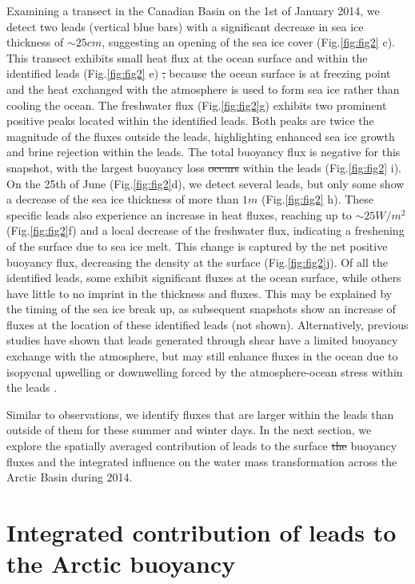 \documentclass[lineno,sn-basic]{sn-jnl}%
\providecommand{\DIFadd}[1]{{\protect\color{blue}\uwave{#1}}} %
\providecommand{\DIFdel}[1]{{\protect\color{red}\sout{#1}}}                      %
\providecommand{\DIFaddbegin}{} %
\providecommand{\DIFaddend}{} %
\providecommand{\DIFdelbegin}{} %
\providecommand{\DIFdelend}{} %
\newcommand{\DIFscaledelfig}{0.5}
\newlength{\DIFdelgraphicswidth} %
\newlength{\DIFdelgraphicsheight} %
\newcommand{\DIFaddincludegraphics}[2][]{{\color{blue}\fbox{\DIFOincludegraphics[#1]{#2}}}} %
\newcommand{\DIFdelincludegraphics}[2][]{%
\sbox{\DIFdelgraphicsbox}{\DIFOincludegraphics[#1]{#2}}%
\settoboxwidth{\DIFdelgraphicswidth}{\DIFdelgraphicsbox} %
\settoboxtotalheight{\DIFdelgraphicsheight}{\DIFdelgraphicsbox} %
\scalebox{\DIFscaledelfig}{%
\parbox[b]{\DIFdelgraphicswidth}{\usebox{\DIFdelgraphicsbox}\\[-\baselineskip] \rule{\DIFdelgraphicswidth}{0em}}\llap{\resizebox{\DIFdelgraphicswidth}{\DIFdelgraphicsheight}{%
\setlength{\unitlength}{\DIFdelgraphicswidth}%
\begin{picture}(1,1)%
\thicklines\linethickness{2pt} %
{\color[rgb]{1,0,0}\put(0,0){\framebox(1,1){}}}%
{\color[rgb]{1,0,0}\put(0,0){\line( 1,1){1}}}%
{\color[rgb]{1,0,0}\put(0,1){\line(1,-1){1}}}%
\end{picture}%
}\hspace*{3pt}}} %
} %
\DeclareRobustCommand{\DIFaddbegin}{\DIFOaddbegin \let\includegraphics\DIFaddincludegraphics} %
\DeclareRobustCommand{\DIFaddend}{\DIFOaddend \let\includegraphics\DIFOincludegraphics} %
\DeclareRobustCommand{\DIFdelbegin}{\DIFOdelbegin \let\includegraphics\DIFdelincludegraphics} %
\DeclareRobustCommand{\DIFdelend}{\DIFOaddend \let\includegraphics\DIFOincludegraphics} %
\begin{document}
Examining a transect in the Canadian Basin on the 1st of January 2014, we detect two leads (vertical blue bars) with a significant decrease in sea ice thickness of $\sim 25cm$, suggesting an opening of the sea ice cover (Fig.\ref{fig:fig2} c).
This transect exhibits small heat flux at the ocean surface and within the identified leads (Fig.\ref{fig:fig2} e) \DIFdelbegin \DIFdel{, }\DIFdelend because the ocean surface is at freezing point and the heat exchanged with the atmosphere is used to form sea ice rather than cooling the ocean.
The freshwater flux (Fig.\ref{fig:fig2}g) exhibits two prominent positive peaks located within the identified leads. Both peaks are twice the magnitude of the fluxes outside the leads, highlighting enhanced sea ice growth and brine rejection within the leads. 
The total buoyancy flux is negative for this snapshot, with the largest buoyancy loss \DIFdelbegin \DIFdel{occurs }\DIFdelend \DIFaddbegin \DIFadd{occurring }\DIFaddend within the leads (Fig.\ref{fig:fig2} i).
On the 25th of June (Fig.\ref{fig:fig2}d), we detect several leads, but only some show a decrease of the sea ice thickness of more than $1m$ (Fig.\ref{fig:fig2} h). These specific leads also experience an increase in heat fluxes, reaching up to $\sim 25 W/m^2$ (Fig.\ref{fig:fig2}f) and a local decrease of the freshwater flux, indicating a freshening of the surface due to sea ice melt. This change is captured by the net positive buoyancy flux, decreasing the density at the surface (Fig.\ref{fig:fig2}j).
Of all the identified leads, some exhibit significant fluxes at the ocean surface, while others have little to no imprint in the thickness and fluxes. This may be explained by the timing of the sea ice break up, as subsequent snapshots show an increase of fluxes at the location of these identified leads (not shown). Alternatively, previous studies have shown that leads generated through shear have a limited buoyancy exchange with the atmosphere, but may still enhance fluxes in the ocean due to isopycnal upwelling or downwelling forced by the atmosphere-ocean stress within the leads \citep{Bourgault_flux_lkf_2020}.

Similar to observations, we identify fluxes that are larger within the leads than outside of them for these summer and winter days. In the next section, we explore the spatially averaged contribution of leads to the surface \DIFdelbegin \DIFdel{the }\DIFdelend buoyancy fluxes and the integrated influence on the water mass transformation across the Arctic Basin during 2014. 

\section{Integrated contribution of leads to the Arctic buoyancy}\label{sec3}
\end{document}
